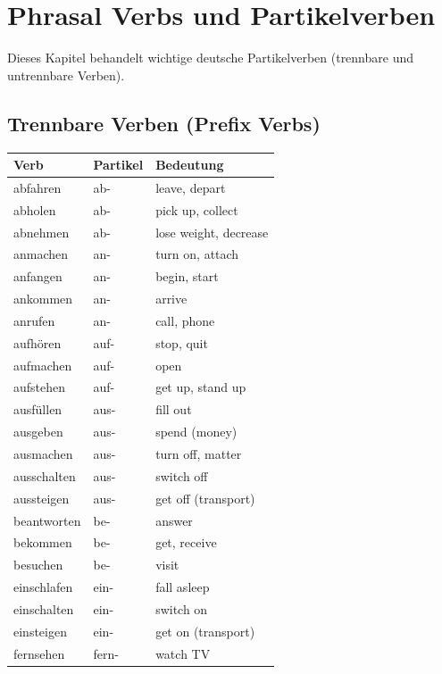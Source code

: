 \chapter{Phrasal Verbs und Partikelverben}
\label{cha:PhrasalVerbs}

Dieses Kapitel behandelt wichtige deutsche Partikelverben (trennbare und untrennbare Verben).

\section{Trennbare Verben (Prefix Verbs)}
\label{sec:Trennbar}

\bigskip
\begin{center}
\begin{tabular}{|l|l|p{6cm}|}
\hline
Verb & Partikel & Bedeutung \\ \hline
abfahren & ab- & leave, depart \\ \hline
abholen & ab- & pick up, collect \\ \hline
abnehmen & ab- & lose weight, decrease \\ \hline
anmachen & an- & turn on, attach \\ \hline
anfangen & an- & begin, start \\ \hline
ankommen & an- & arrive \\ \hline
anrufen & an- & call, phone \\ \hline
aufhören & auf- & stop, quit \\ \hline
aufmachen & auf- & open \\ \hline
aufstehen & auf- & get up, stand up \\ \hline
ausfüllen & aus- & fill out \\ \hline
ausgeben & aus- & spend (money) \\ \hline
ausmachen & aus- & turn off, matter \\ \hline
ausschalten & aus- & switch off \\ \hline
aussteigen & aus- & get off (transport) \\ \hline
beantworten & be- & answer \\ \hline
bekommen & be- & get, receive \\ \hline
besuchen & be- & visit \\ \hline
einschlafen & ein- & fall asleep \\ \hline
einschalten & ein- & switch on \\ \hline
einsteigen & ein- & get on (transport) \\ \hline
fernsehen & fern- & watch TV \\ \hline

\end{tabular}
\end{center}
